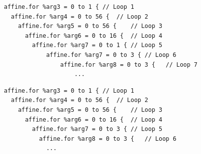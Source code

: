 \begin{lstlisting}[caption={Example depth-wise conv2d at Affine dialect}, label={lst:dconv2d_hwcm}]
affine.for %arg3 = 0 to 1 { // Loop 1
  affine.for %arg4 = 0 to 56 {  // Loop 2
    affine.for %arg5 = 0 to 56 {    // Loop 3
      affine.for %arg6 = 0 to 16 {  // Loop 4
        affine.for %arg7 = 0 to 1 { // Loop 5
            affine.for %arg7 = 0 to 3 { // Loop 6
                affine.for %arg8 = 0 to 3 {   // Loop 7
                    ...
\end{lstlisting}

\begin{lstlisting}[caption={Example depth-wise conv2d at Affine dialect}, label={lst:dconv2d_hwc}]
affine.for %arg3 = 0 to 1 { // Loop 1
  affine.for %arg4 = 0 to 56 {  // Loop 2
    affine.for %arg5 = 0 to 56 {    // Loop 3
      affine.for %arg6 = 0 to 16 {  // Loop 4
        affine.for %arg7 = 0 to 3 { // Loop 5
          affine.for %arg8 = 0 to 3 {   // Loop 6
            ...
\end{lstlisting}
